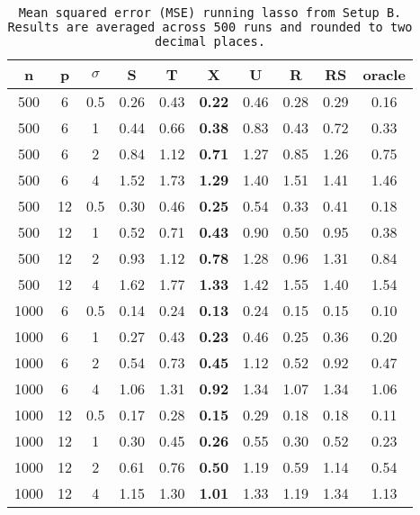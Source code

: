 \begin{table}[ht]
\centering
\begin{tabular}{cccccccccc}
  \hline
n & p & $\sigma$ & S & T & X & U & R & RS & oracle \\ 
  \hline
500 & 6 & 0.5 & 0.26 & 0.43 & \bf 0.22 & 0.46 & 0.28 & 0.29 & 0.16 \\ 
  500 & 6 & 1 & 0.44 & 0.66 & \bf 0.38 & 0.83 & 0.43 & 0.72 & 0.33 \\ 
  500 & 6 & 2 & 0.84 & 1.12 & \bf 0.71 & 1.27 & 0.85 & 1.26 & 0.75 \\ 
  500 & 6 & 4 & 1.52 & 1.73 & \bf 1.29 & 1.40 & 1.51 & 1.41 & 1.46 \\ 
  500 & 12 & 0.5 & 0.30 & 0.46 & \bf 0.25 & 0.54 & 0.33 & 0.41 & 0.18 \\ 
  500 & 12 & 1 & 0.52 & 0.71 & \bf 0.43 & 0.90 & 0.50 & 0.95 & 0.38 \\ 
  500 & 12 & 2 & 0.93 & 1.12 & \bf 0.78 & 1.28 & 0.96 & 1.31 & 0.84 \\ 
  500 & 12 & 4 & 1.62 & 1.77 & \bf 1.33 & 1.42 & 1.55 & 1.40 & 1.54 \\ 
  1000 & 6 & 0.5 & 0.14 & 0.24 & \bf 0.13 & 0.24 & 0.15 & 0.15 & 0.10 \\ 
  1000 & 6 & 1 & 0.27 & 0.43 & \bf 0.23 & 0.46 & 0.25 & 0.36 & 0.20 \\ 
  1000 & 6 & 2 & 0.54 & 0.73 & \bf 0.45 & 1.12 & 0.52 & 0.92 & 0.47 \\ 
  1000 & 6 & 4 & 1.06 & 1.31 & \bf 0.92 & 1.34 & 1.07 & 1.34 & 1.06 \\ 
  1000 & 12 & 0.5 & 0.17 & 0.28 & \bf 0.15 & 0.29 & 0.18 & 0.18 & 0.11 \\ 
  1000 & 12 & 1 & 0.30 & 0.45 & \bf 0.26 & 0.55 & 0.30 & 0.52 & 0.23 \\ 
  1000 & 12 & 2 & 0.61 & 0.76 & \bf 0.50 & 1.19 & 0.59 & 1.14 & 0.54 \\ 
  1000 & 12 & 4 & 1.15 & 1.30 & \bf 1.01 & 1.33 & 1.19 & 1.34 & 1.13 \\ 
   \hline
\end{tabular}
\caption{\tt Mean squared error (MSE) running \texttt{lasso} from Setup B. Results are averaged across 500 runs and rounded to two decimal places.} 
\label{table:setup2}
\end{table}
